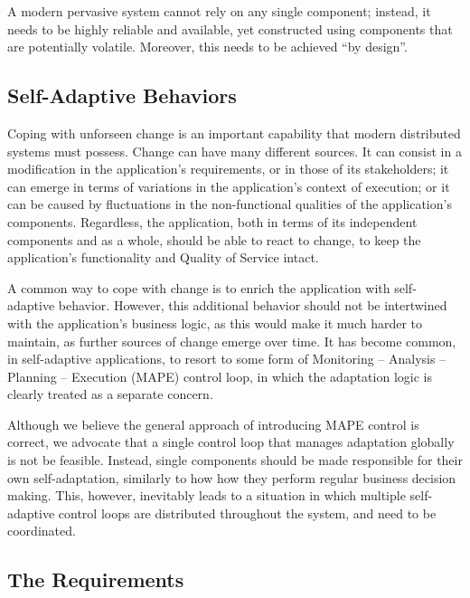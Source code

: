 A modern pervasive system cannot rely on any single component; instead, it needs to be highly reliable and available, yet constructed using components that are potentially volatile. Moreover, this needs to be achieved ``by design''.

\subsection{Self-Adaptive Behaviors}
\label{sub:selfAdaptive}


Coping with unforseen change is an important capability that modern distributed systems must possess. Change can have many different sources. It can consist in a modification in the application's requirements, or in those of its stakeholders; it can emerge in terms of variations in the application's context of execution; or it can be caused by fluctuations in the non-functional qualities of the application's components. Regardless, the application, both in terms of its independent components and as a whole, should be able to react to change, to keep the application's functionality and Quality of Service intact.

A common way to cope with change is to enrich the application with self-adaptive behavior. However, this additional behavior should not be intertwined with the application's business logic, as this would make it much harder to maintain, as further sources of change emerge over time. It has become common, in self-adaptive applications, to resort to some form of Monitoring -- Analysis -- Planning -- Execution (MAPE) control loop, in which the adaptation logic is clearly treated as a separate concern. 

Although we believe the general approach of introducing MAPE control is correct, we advocate that a single control loop that manages adaptation globally is not be feasible. Instead, single components should be made responsible for their own self-adaptation, similarly to how how they perform regular business decision making. This, however, inevitably leads to a situation in which multiple self-adaptive control loops are distributed throughout the system, and need to be coordinated. 

\subsection{The Requirements}
\label{sub:requirements}

